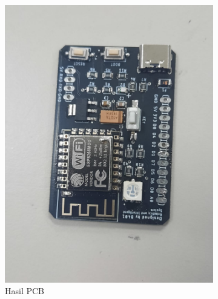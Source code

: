 \begin{figure}[H]
  \centering
  \begin{subfigure}[c]{0.4\linewidth}
    \centering
    \includegraphics[width=\linewidth]{img/modul_4/hasil_pcb.jpg}
    \caption{Hasil PCB \label{fig:inisub1}}
  \end{subfigure}
  \hspace{1cm}
  \begin{subfigure}[c]{0.4\linewidth}
    \centering

\end{subfigure}
\end{figure}
